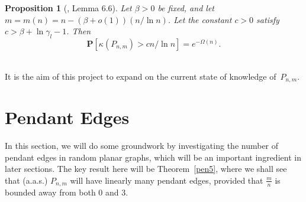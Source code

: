 \documentclass{article}
\newtheorem{Proposition}[Theorem]{Proposition}
\newtheorem{Proof of Theorem}{Proof of Theorem}
\begin{document}
\begin{Proposition}[\cite{ger3}, Lemma 6.6] \label{ger3 6.6}
Let $\beta >0$ be fixed,
and let $m=m(n)= n - (\beta +o(1))(n/ \ln n)$.
Let the constant $c>0$ satisfy $c > \beta + \ln \gamma_{l} - 1$.
Then
\begin{displaymath}
\mathbf{P} \left[ \kappa \left( P_{n,m} \right) > cn/ \ln n \right] = e^{-\Omega(n)}.
\end{displaymath} \\
\end{Proposition}















It is the aim of this project to expand on the current state of knowledge of~$P_{n,m}$.













































\newpage
\section{Pendant Edges} \label{pen}















In this section, we will do some groundwork by investigating the number of pendant edges in random planar graphs,
which will be an important ingredient in later sections. 
The key result here will be Theorem~\ref{pen5}, where we shall see that (a.a.s.)
$P_{n,m}$ will have linearly many pendant edges, provided that $\frac{m}{n}$ is bounded away from both $0$ and $3$. 
\end{document}
